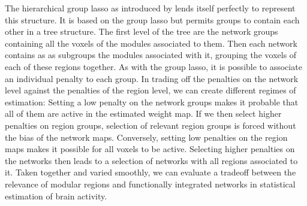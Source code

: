 \documentclass{article} %
\begin{document}
The hierarchical group lasso as introduced by \cite{jenatton2011} lends
itself perfectly to represent this structure. It is based on the group lasso
\cite{group_lasso} but permits groups to contain each other in a tree
structure. The first level of the tree are the network groups containing all
the voxels of the modules associated to them. Then each network contains as
as subgroups the modules associated with it, grouping the voxels of each of
these regions together.
As with the group lasso, it is possible to associate an individual penalty
to each group. In trading off the penalties on the network level against the
penalties of the region level, we can create different regimes of 
estimation: 
%
Setting a low penalty on the network groups makes it probable
that all of them are active in the estimated weight map. If we then select
higher penalties on region groups, selection of relevant region groups is
forced without the bias of the network maps.
%
Conversely, setting low penalties on the region maps makes it possible for
all voxels to be active. Selecting higher penalties on the networks then
leads to a selection of networks with all regions associated to it.
%
Taken together and varied smoothly, we can evaluate a tradeoff between the
relevance of modular regions and functionally integrated networks in 
statistical estimation of brain activity.



\end{document}
